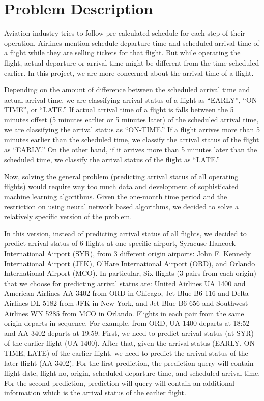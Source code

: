 
\section{Problem Description}
\label{sec:problem}

Aviation industry tries to follow pre-calculated schedule for each step of their operation.
Airlines mention schedule departure time and scheduled arrival time of a flight while they are selling tickets for that flight.
But while operating the flight, actual departure or arrival time might be different from the time scheduled earlier. 
In this project, we are more concerned about the arrival time of a flight.

Depending on the amount of difference between the scheduled arrival time and actual arrival time,
we are classifying arrival status of a flight as ``EARLY'', ``ON-TIME'', or ``LATE.''
If actual arrival time of a flight is falls between the 5 minutes offset (5 minutes earlier or 5 minutes later) of the scheduled arrival time,
we are classifying the arrival status as ``ON-TIME.'' 
If a flight arrives more than 5 minutes earlier than the scheduled time, we classify the arrival status of the flight as ``EARLY.''
On the other hand, if it arrives more than 5 minutes later than the scheduled time, we classify the arrival status of the flight as ``LATE.''

Now, solving the general problem (predicting arrival status of all operating flights) would require way too much data
and development of sophisticated machine learning algorithms.
Given the one-month time period and the restriction on using neural network based algorithms, we decided to solve a relatively specific version of the problem.

In this version, instead of predicting arrival status of all flights, we decided to predict arrival status of 6 flights at one specific airport, Syracuse Hancock International Airport (SYR), from 3 different origin airports:
John F. Kennedy International Airport (JFK),
O'Hare International Airport (ORD), and Orlando International Airport (MCO).
In particular, Six flights (3 pairs from each origin) that we choose for predicting arrival status are: United Airlines UA 1400 and American Airlines AA 3402 from ORD in Chicago,
Jet Blue B6 116 and Delta Airlines DL 5182 from JFK in New York, 
and Jet Blue B6 656 and Southwest Airlines WN 5285 from MCO in Orlando. 
Flights in each pair from the same origin departs in sequence.
For example, from ORD, UA 1400 departs at 18:52 and AA 3402 departs at 19:59.
First, we need to predict arrival status (at SYR) of the earlier flight (UA 1400).
After that, given the arrival status (EARLY, ON-TIME, LATE) of the earlier flight, we need to predict the arrival status of the later flight (AA 3402).
For the first prediction, the prediction query will contain flight date, flight no, origin, scheduled departure time, and  scheduled arrival time. 
For the second prediction, prediction will query will contain an additional information which is the arrival status of the earlier flight.
 